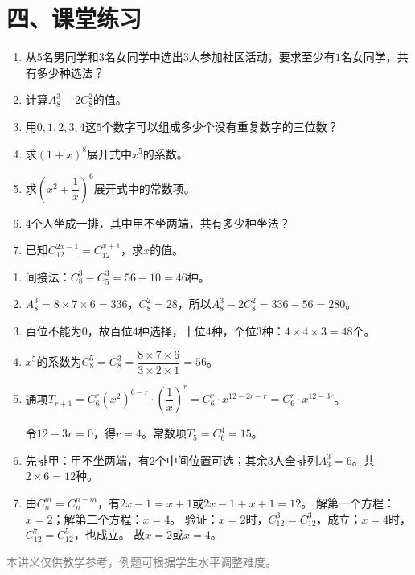 \documentclass[12pt, a4paper]{ctexart}
\begin{document}
\vspace{8pt}
\section*{\textcolor{tipgreen}{四、课堂练习}}

\begin{enumerate}
  \item 从$5$名男同学和$3$名女同学中选出$3$人参加社区活动，要求至少有$1$名女同学，共有多少种选法？

  \item 计算$A_8^3 - 2C_8^2$的值。

  \item 用$0, 1, 2, 3, 4$这$5$个数字可以组成多少个没有重复数字的三位数？

  \item 求$(1+x)^8$展开式中$x^5$的系数。

  \item 求$\left(x^2 + \dfrac{1}{x}\right)^6$展开式中的常数项。

  \item $4$个人坐成一排，其中甲不坐两端，共有多少种坐法？

  \item 已知$C_{12}^{2x-1} = C_{12}^{x+1}$，求$x$的值。
\end{enumerate}

\vspace{10pt}
\begin{knowledgebox}[参考答案]
\begin{enumerate}
  \item 间接法：$C_8^3 - C_5^3 = 56 - 10 = 46$种。

  \item $A_8^3 = 8 \times 7 \times 6 = 336$，$C_8^2 = 28$，所以$A_8^3 - 2C_8^2 = 336 - 56 = 280$。

  \item 百位不能为$0$，故百位$4$种选择，十位$4$种，个位$3$种：$4 \times 4 \times 3 = 48$个。

  \item $x^5$的系数为$C_8^5 = C_8^3 = \dfrac{8 \times 7 \times 6}{3 \times 2 \times 1} = 56$。

  \item 通项$T_{r+1} = C_6^r (x^2)^{6-r} \cdot \left(\dfrac{1}{x}\right)^r = C_6^r \cdot x^{12-2r-r} = C_6^r \cdot x^{12-3r}$。

  令$12 - 3r = 0$，得$r = 4$。常数项$T_5 = C_6^4 = 15$。

  \item 先排甲：甲不坐两端，有$2$个中间位置可选；其余$3$人全排列$A_3^3 = 6$。共$2 \times 6 = 12$种。

  \item 由$C_n^m = C_n^{n-m}$，有$2x - 1 = x + 1$或$2x - 1 + x + 1 = 12$。
  解第一个方程：$x = 2$；解第二个方程：$x = 4$。
  验证：$x = 2$时，$C_{12}^3 = C_{12}^3$，成立；$x = 4$时，$C_{12}^7 = C_{12}^5$，也成立。
  故$x = 2$或$x = 4$。
\end{enumerate}
\end{knowledgebox}

\vfill
\begin{center}
\small\textcolor{gray}{本讲义仅供教学参考，例题可根据学生水平调整难度。}
\end{center}
\end{document}
